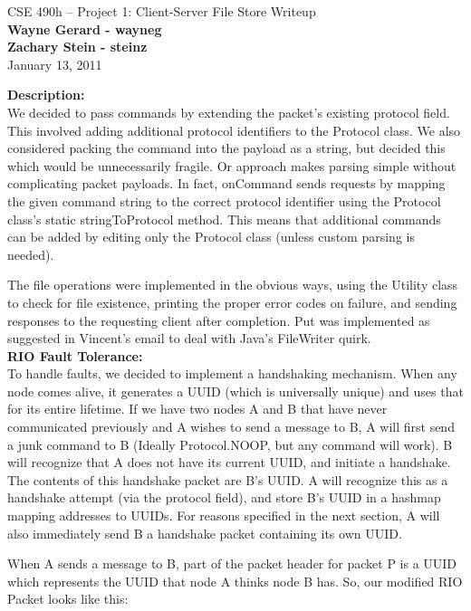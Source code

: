\documentclass[11pt]{article}
\begin{document}
\begin{center}
{\large CSE 490h -- Project 1: Client-Server File Store Writeup} \\
\textbf{Wayne Gerard - wayneg} \\
\textbf{Zachary Stein - steinz} \\
January 13, 2011
\end{center}

\textbf{Description:} \\

We decided to pass commands by extending the packet's existing protocol field. This involved adding additional protocol identifiers to the Protocol class. We also considered packing the command into the payload as a string, but decided this  which would be unnecessarily fragile. Or approach makes parsing simple without complicating packet payloads. In fact, onCommand sends requests by mapping the given command string to the correct protocol identifier using the Protocol class's static stringToProtocol method. This means that additional commands can be added by editing only the Protocol class (unless custom parsing is needed).

The file operations were implemented in the obvious ways, using the Utility class to check for file existence, printing the proper error codes on failure, and sending responses to the requesting client after completion. Put was implemented as suggested in Vincent's email to deal with Java's FileWriter quirk. \\

\textbf{RIO Fault Tolerance:} \\

To handle faults, we decided to implement a handshaking mechanism. When any node comes alive, it generates a UUID (which is universally unique) and uses that for its entire lifetime. If we have two nodes A and B that have never communicated previously and A wishes to send a message to B, A will first send a junk command to B (Ideally Protocol.NOOP, but any command will work). B will recognize that A does not have its current UUID, and initiate a handshake. The contents of this handshake packet are B's UUID. A will recognize this as a handshake attempt (via the protocol field), and store B's UUID in a hashmap mapping addresses to UUIDs. For reasons specified in the next section, A will also immediately send B a handshake packet containing its own UUID.

When A sends a message to B, part of the packet header for packet P is a UUID which represents the UUID that node A thinks node B has. So, our modified RIO Packet looks like this:
\end{document}
